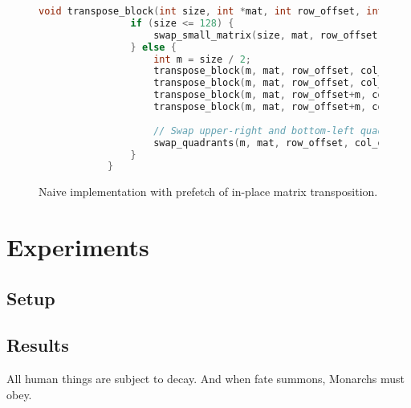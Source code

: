 \documentclass{scrartcl}
\begin{document}
    \begin{figure}
        \begin{lstlisting}[language=C]
            void transpose_block(int size, int *mat, int row_offset, int col_offset) {
                if (size <= 128) {
                    swap_small_matrix(size, mat, row_offset, col_offset);
                } else {
                    int m = size / 2;
                    transpose_block(m, mat, row_offset, col_offset);
                    transpose_block(m, mat, row_offset, col_offset+m);
                    transpose_block(m, mat, row_offset+m, col_offset);
                    transpose_block(m, mat, row_offset+m, col_offset+m);
            
                    // Swap upper-right and bottom-left quadrants
                    swap_quadrants(m, mat, row_offset, col_offset);
                }
            }
        \end{lstlisting}
        \caption{Naive implementation with prefetch of in-place matrix transposition.}
        \label{fig:rec_implementation}        
    \end{figure}

    \section{Experiments} \label{sec:experiments}
    \subsection{Setup}
    \subsection{Results}
    All human things are subject to decay. And when fate summons, Monarchs must obey.

    \printbibliography
\end{document}
